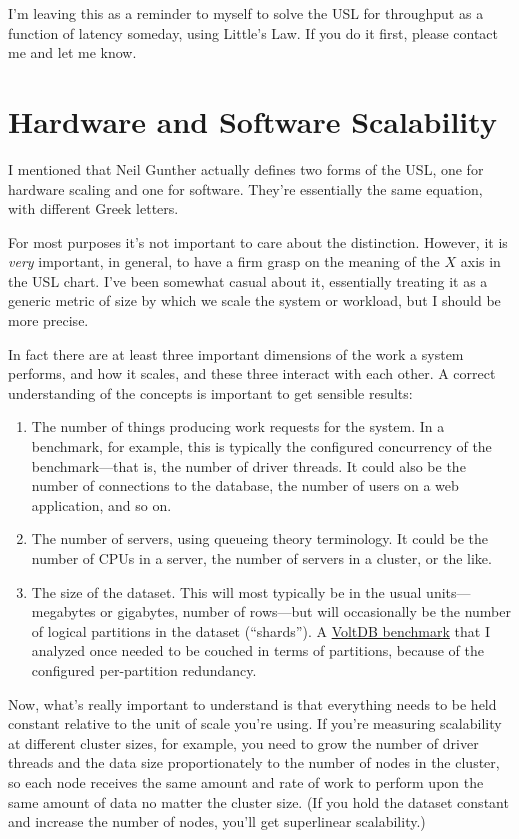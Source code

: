 \documentclass{vivid_layout}
\begin{document}
I'm leaving this as a reminder to myself to solve the USL for throughput as a
function of latency someday, using Little's Law. If you do it first, please
contact me and let me know.

\section{Hardware and Software Scalability}

I mentioned that Neil Gunther actually defines two forms of the USL, one for
hardware scaling and one for software. They're essentially the same equation,
with different Greek letters.

For most purposes it's not important to care about the distinction. However, it
is {\itshape very} important, in general, to have a firm grasp on the meaning of
the $X$ axis in the USL chart. I've been somewhat casual about it, essentially
treating it as a generic metric of size by which we scale the system or
workload, but I should be more precise.

In fact there are at least three important dimensions of the work a system
performs, and how it scales, and these three interact with each other. A correct
understanding of the concepts is important to get sensible results:

\begin{enumerate}
\item The number of things producing work requests for the
system. In a benchmark, for example, this is typically the configured
concurrency of the benchmark---that is, the number of driver threads. It could
also be the number of connections to the database, the number of users on a web
application, and so on.
\item The number of servers, using queueing theory terminology. It could be the
number of CPUs in a server, the number of servers in a cluster, or the like.
\item The size of the dataset. This will most typically be in the usual
units---megabytes or gigabytes, number of rows---but will occasionally be the
number of logical partitions in the dataset (``shards''). A
\href{https://www.percona.com/blog/2011/02/28/is-voltdb-really-as-scalable-as-they-claim/}{VoltDB
benchmark} that I analyzed once needed to be couched in terms of partitions,
because of the configured per-partition redundancy.
\end{enumerate}

Now, what's really important to understand is that everything needs to be held
constant relative to the unit of scale you're using. If you're measuring
scalability at different cluster sizes, for example, you need to grow the number
of driver threads and the data size proportionately to the number of nodes in
the cluster, so each node receives the same amount and rate of work to perform
upon the same amount of data no matter the cluster size. (If you hold the
dataset constant and increase the number of nodes, you'll get superlinear
scalability.)
\end{document}
